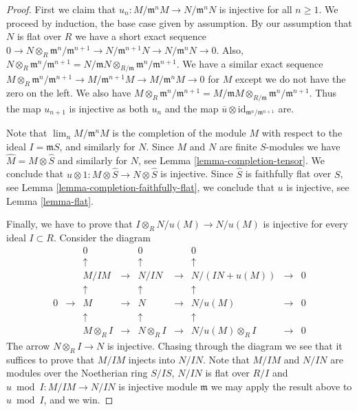 \begin{proof}
First we claim that $u_n : M/{\mathfrak m}^nM \to N/{\mathfrak m}^nN$
is injective for all $n \geq 1$. We proceed by induction, the base
case given by assumption. By our assumption that $N$ is flat
over $R$ we have  a short exact sequence
$0 \to N\otimes_R {\mathfrak m}^n/{\mathfrak m}^{n + 1}
\to N/{\mathfrak m}^{n + 1}N \to N/{\mathfrak m}^n N\to 0$.
Also, $N\otimes_R {\mathfrak m}^n/{\mathfrak m}^{n + 1}
= N/{\mathfrak m}N \otimes_{R/{\mathfrak m}}
{\mathfrak m}^n/{\mathfrak m}^{n + 1}$. We have
a similar exact sequence $M\otimes_R {\mathfrak m}^n/{\mathfrak m}^{n + 1}
\to M/{\mathfrak m}^{n + 1}M \to M/{\mathfrak m}^n M\to 0$
for $M$ except we do not have the zero on the left. We also
have $M\otimes_R {\mathfrak m}^n/{\mathfrak m}^{n + 1}
= M/{\mathfrak m}M \otimes_{R/{\mathfrak m}}
{\mathfrak m}^n/{\mathfrak m}^{n + 1}$. Thus the map $u_{n + 1}$ is
injective as both $u_n$ and the map
$\overline{u}\otimes \text{id}_{{\mathfrak m}^n/{\mathfrak m}^{n + 1}}$ are.

\medskip\noindent
Note that $\lim_n M/{\mathfrak m}^nM$ is the completion
of the module $M$ with respect to the ideal $I = {\mathfrak m}S$,
and similarly for $N$. Since $M$ and $N$ are finite $S$-modules
we have $\hat M = M \otimes \hat S$ and similarly for $N$, see Lemma
\ref{lemma-completion-tensor}.
We conclude that $u \otimes 1 : M \otimes \hat S
\to N \otimes \hat S$ is injective. Since $\hat S$ is faithfully
flat over $S$, see Lemma \ref{lemma-completion-faithfully-flat},
we conclude that $u$ is injective, see Lemma \ref{lemma-flat}.

\medskip\noindent
Finally, we have to prove that $I \otimes_R N/u(M) \to N/u(M)$
is injective for every ideal $I \subset R$. Consider the diagram
$$
\begin{matrix}
&
&
0
&
&
0
&
&
0
&
&
\\
&
&
\uparrow
&
&
\uparrow
&
&
\uparrow
&
&
\\
&
&
M/IM
&
\to
&
N/IN
&
\to
&
N/(IN + u(M))
&
\to
&
0
\\
&
&
\uparrow
&
&
\uparrow
&
&
\uparrow
&
&
\\
0
&
\to
&
M
&
\to
&
N
&
\to
&
N/u(M)
&
\to
&
0
\\
&
&
\uparrow
&
&
\uparrow
&
&
\uparrow
&
&
\\
&
&
M \otimes_R I
&
\to
&
N \otimes_R I
&
\to
&
N/u(M)\otimes_R I
&
\to
&
0
\end{matrix}
$$
The arrow $N\otimes_R I \to N$ is injective.
Chasing through the diagram we see
that it suffices to prove that
$M/IM$ injects into $N/IN$.
Note that $M/IM$ and $N/IN$ are modules
over the Noetherian ring $S/IS$,
$N/IN$ is flat over $R/I$ and
$u \bmod I : M/IM \to N/IN$ is injective
module $\mathfrak m$ we may apply
the result above to $u \bmod I$, and we win.
\end{proof}

